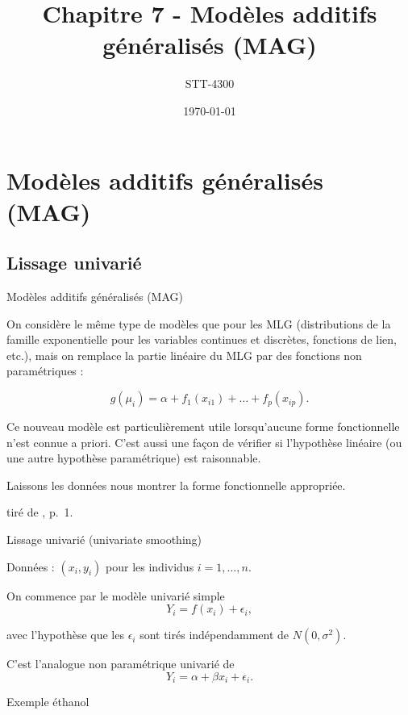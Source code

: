 \documentclass{BeamerTemplate}
\title{Chapitre 7 - Modèles additifs généralisés (MAG)}
\subtitle{STT-4300}
\date{\today}
\begin{document}
\begin{refsection}

\begin{frame}[t]
\titlepage
\end{frame}

\section{Modèles additifs généralisés (MAG)}
\label{GAM.section}

\subsection{Lissage univarié}
\begin{frame}{Modèles additifs généralisés (MAG)}

On considère le même type de modèles que pour les MLG (distributions de la famille exponentielle pour les variables continues et discrètes, fonctions de lien, etc.), mais on remplace la partie linéaire du MLG par des fonctions non paramétriques :

$$g(\mu_i) = \alpha + f_1(x_{i1}) + \ldots + f_p(x_{ip}).$$

Ce nouveau modèle est particulièrement utile lorsqu'aucune forme fonctionnelle n'est connue a priori. C'est aussi une façon de vérifier si l'hypothèse linéaire (ou une autre hypothèse paramétrique) est raisonnable.

\begin{center}
{\color{blue}Laissons les données nous montrer la forme fonctionnelle appropriée.}
\end{center}
tiré de , p.~1.

\end{frame}

\begin{frame}{Lissage univarié (univariate smoothing)}

Données : $(x_i,y_i)$ pour les individus $i=1,\ldots,n$.

\bigskip
On commence par le modèle univarié simple
$$Y_i = f(x_i) + \epsilon_i,$$

avec l'hypothèse que les $\epsilon_i$ sont tirés indépendamment de $N(0, \sigma^2)$.

\bigskip
C'est l'analogue non paramétrique univarié de
$$Y_i = \alpha + \beta x_i + \epsilon_i.$$
\end{frame}


\begin{frame}{Exemple éthanol}


\end{frame}
\end{refsection}
\end{document}
